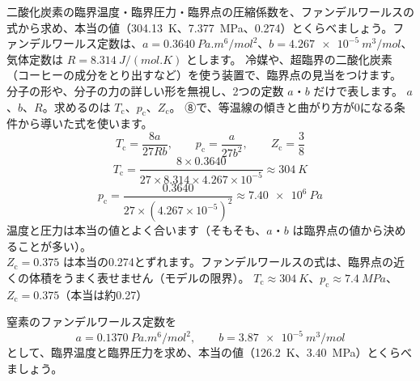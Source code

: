 \label{ph:熱-10:ex4}
\begin{phreidai}
二酸化炭素の臨界温度・臨界圧力・臨界点の圧縮係数を、ファンデルワールスの式から求め、本当の値（\qty{304.13}{K}、\qty{7.377}{MPa}、0.274）とくらべましょう。ファンデルワールス定数は、$a=\qty{0.3640}{Pa.m^6/mol^2}$、$b=\qty{4.267e-5}{m^3/mol}$、気体定数は $R=\qty{8.314}{J/(mol.K)}$ とします。
\phbamen
冷媒や、超臨界の二酸化炭素（コーヒーの成分をとり出すなど）を使う装置で、臨界点の見当をつけます。
\phmushi
分子の形や、分子の力の詳しい形を無視し、2つの定数 $a$・$b$ だけで表します。
\phzu
$a$、$b$、$R$。求めるのは $T_{\mathrm c}$、$p_{\mathrm c}$、$Z_{\mathrm c}$。
\phriyu
⑧で、等温線の傾きと曲がり方が0になる条件から導いた式を使います。
\phtateru
\[T_{\mathrm c}=\frac{8a}{27Rb},\qquad p_{\mathrm c}=\frac{a}{27b^2},\qquad Z_{\mathrm c}=\frac{3}{8}\]
\phtoku
\[T_{\mathrm c}=\frac{8\times0.3640}{27\times8.314\times4.267\times10^{-5}}\approx\qty{304}{K}\]
\[p_{\mathrm c}=\frac{0.3640}{27\times(4.267\times10^{-5})^2}\approx\qty{7.40e6}{Pa}\]
\phtashikame
温度と圧力は本当の値とよく合います（そもそも、$a$・$b$ は臨界点の値から決めることが多い）。\\
$Z_{\mathrm c}=0.375$ は本当の0.274とずれます。ファンデルワールスの式は、臨界点の近くの体積をうまく表せません（モデルの限界）。
\kotae $T_{\mathrm c}\approx\qty{304}{K}$、$p_{\mathrm c}\approx\qty{7.4}{MPa}$、$Z_{\mathrm c}=0.375$（本当は約0.27）
\end{phreidai}
\begin{jibun}
窒素のファンデルワールス定数を
\[a=\qty{0.1370}{Pa.m^6/mol^2},\qquad b=\qty{3.87e-5}{m^3/mol}\]
として、臨界温度と臨界圧力を求め、本当の値（\qty{126.2}{K}、\qty{3.40}{MPa}）とくらべましょう。
\end{jibun}

